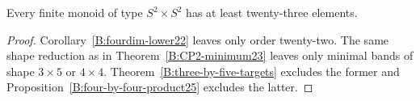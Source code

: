 \begin{corollary}\label{B:product-lower23}
Every finite monoid of type $S^2\times S^2$ has at least
twenty-three elements.
\end{corollary}
\begin{proof}
Corollary~\ref{B:fourdim-lower22} leaves only order twenty-two.
The same shape reduction as in Theorem~\ref{B:CP2-minimum23}
leaves only minimal bands of shape $3\times5$ or $4\times4$.
Theorem~\ref{B:three-by-five-targets} excludes the former and
Proposition~\ref{B:four-by-four-product25} excludes the latter.
\end{proof}
